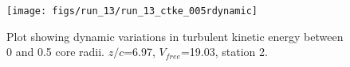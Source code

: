 \begin{figure}[H]
\centering
\texttt{[image: figs/run\_13/run\_13\_ctke\_005rdynamic]}
\caption{Plot showing dynamic variations in turbulent kinetic energy between 0 and 0.5 core radii. $z/c$=6.97, $V_{free}$=19.03, station 2.}
\label{fig:run_13_ctke_005rdynamic}
\end{figure}



